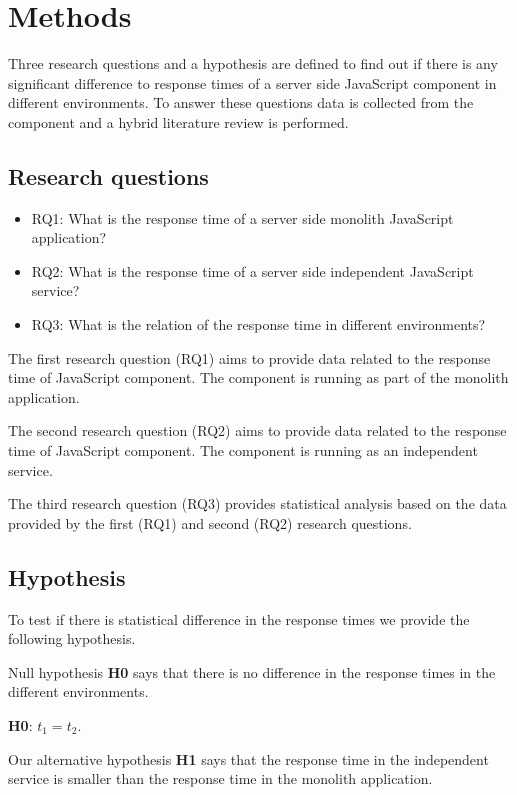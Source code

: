 \chapter{Methods\label{methods}}
Three research questions and a hypothesis are defined to find out if there is any significant difference to response times of a server side JavaScript component in different environments.
To answer these questions data is collected from the component and a hybrid literature review is performed.

\section{Research questions}
\begin{itemize}
    \item RQ1\label{RQ1}: What is the response time of a server side monolith JavaScript application?
    \item RQ2\label{RQ2}: What is the response time of a server side independent JavaScript service?
    \item RQ3\label{RQ3}: What is the relation of the response time in different environments?
\end{itemize}

The first research question (RQ1) aims to provide data related to the response time of JavaScript component. The component is running as part of the monolith application.

The second research question (RQ2) aims to provide data related to the response time of JavaScript component. The component is running as an independent service.

The third research question (RQ3) provides statistical analysis based on the data provided by the first (RQ1) and second (RQ2) research questions.

\section{Hypothesis}
To test if there is statistical difference in the response times we provide the following hypothesis.

Null hypothesis \textbf{H0} says that there is no difference in the response times in the different environments.

\textbf{H0}\label{H0}: $t_1=t_2$.

Our alternative hypothesis \textbf{H1} says that the response time in the independent service is smaller than the response time in the monolith application.

